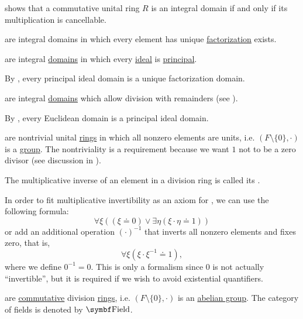 \begin{definition}
\begin{DefEnum}[resume=def:semiring]
     shows that a commutative unital ring \( R \) is an integral domain if and only if its multiplication is cancellable.

      are integral domains in which every element has unique \hyperref[def:factorization_in_ring]{factorization} exists.

      are integral \hyperref[def:semiring/integral_domain]{domains} in which every \hyperref[def:semiring_ideal]{ideal} is \hyperref[def:principal_ideal]{principal}.

    By , every principal ideal domain is a unique factorization domain.

      are integral \hyperref[def:semiring/integral_domain]{domains} which allow division with remainders (see ).

    By , every Euclidean domain is a principal ideal domain.

      are nontrivial unital \hyperref[def:semiring/unital_ring]{rings} in which all nonzero elements are units, i.e. \( (F \setminus \{ 0 \}, \cdot) \) is a \hyperref[def:magma/group]{group}. The nontriviality is a requirement because we want \( 1 \) not to be a zero divisor (see discussion in ).

    The multiplicative inverse of an element in a division ring is called its .

    In order to fit multiplicative invertibility as an axiom for , we can use the following formula:
    \begin{equation*}
      \forall \xi ((\xi \doteq 0) \lor \exists \eta (\xi \cdot \eta \doteq 1))
    \end{equation*}
    or add an additional operation \( (\cdot)^{-1} \) that inverts all nonzero elements and fixes zero, that is,
    \begin{equation*}
      \forall \xi (\xi \cdot \xi^{-1} \doteq 1),
    \end{equation*}
    where we define \( 0^{-1} = 0 \). This is only a formalism since \( 0 \) is not actually \enquote{invertible}, but it is required if we wish to avoid existential quantifiers.

      are \hyperref[def:algebraic_theory/commutativity]{commutative} division \hyperref[def:semiring/division_ring]{rings}, i.e. \( (F \setminus \{ 0 \}, \cdot) \) is an \hyperref[def:abelian_group]{abelian group}. The category of fields is denoted by \( \Cat{Field} \).
  \end{DefEnum}
\end{definition}

